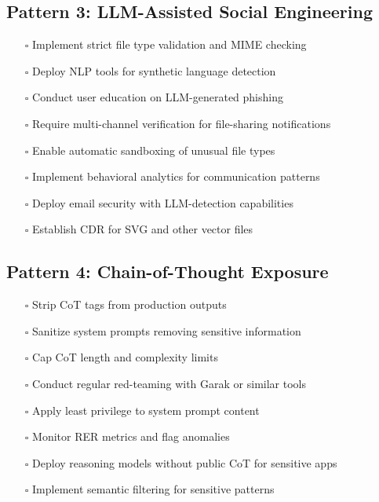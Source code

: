 \documentclass[11pt,a4paper]{article}
\begin{document}
\subsection{Pattern 3: LLM-Assisted Social Engineering}

\begin{itemize}
\item[$\square$] Implement strict file type validation and MIME checking
\item[$\square$] Deploy NLP tools for synthetic language detection
\item[$\square$] Conduct user education on LLM-generated phishing
\item[$\square$] Require multi-channel verification for file-sharing notifications
\item[$\square$] Enable automatic sandboxing of unusual file types
\item[$\square$] Implement behavioral analytics for communication patterns
\item[$\square$] Deploy email security with LLM-detection capabilities
\item[$\square$] Establish CDR for SVG and other vector files
\end{itemize}

\subsection{Pattern 4: Chain-of-Thought Exposure}

\begin{itemize}
\item[$\square$] Strip CoT tags from production outputs
\item[$\square$] Sanitize system prompts removing sensitive information
\item[$\square$] Cap CoT length and complexity limits
\item[$\square$] Conduct regular red-teaming with Garak or similar tools
\item[$\square$] Apply least privilege to system prompt content
\item[$\square$] Monitor RER metrics and flag anomalies
\item[$\square$] Deploy reasoning models without public CoT for sensitive apps
\item[$\square$] Implement semantic filtering for sensitive patterns
\end{itemize}
\end{document}
